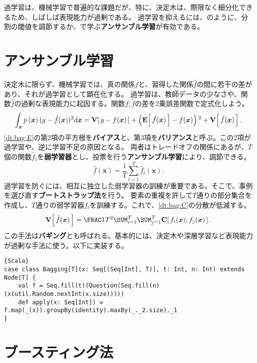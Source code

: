 \documentclass[10pt,a4paper]{book}
\begin{document}
過学習は、機械学習で普遍的な課題だが、特に、決定木は、際限なく細分化できるため、しばしば表現能力が過剰である。
過学習を抑えるには、のように、分割の閾値を調節するか、で学ぶ\textbf{アンサンブル学習}が有効である。

\section{アンサンブル学習\label{sect:dt:ensem}}

決定木に限らず、機械学習では、真の関係$f$と、習得した関係$\hat{f}$の間に若干の差があり、それが過学習として顕在化する。
過学習は、教師データの少なさや、関数$\hat{f}$の過剰な表現能力に起因する。関数$f,\hat{f}$の差を2乗誤差関数で定式化しよう。
%
\begin{equation}
\label{eq:dt:bag:E}
\int_{\bm{x}}\prob{\bm{x}}(y-\hat{f}(\bm{x}))^2d\bm{x} = \Var{y-f(\bm{x})} + \tup{\E{\hat{f}(\bm{x})} - f(\bm{x})}^2 + \Var{\hat{f}(\bm{x})}.
\end{equation}
%
\eqref{dt:bag:E}の第2項の平方根を\textbf{バイアス}と、第3項を\textbf{バリアンス}と呼ぶ。この2項が過学習や、逆に学習不足の原因となる。
両者はトレードオフの関係にあるが、$T$個の関数$\hat{f}_t$を\textbf{弱学習器}とし、投票を行う\textbf{アンサンブル学習}により、調節できる。
%
\begin{equation}
\label{eq:dt:bag:f}
\hat{f}(\bm{x}) = \frac{1}{T} \sum_{t=1}^T \hat{f}_t(\bm{x}).
\end{equation}
%
過学習を防ぐには、相互に独立した弱学習器の訓練が重要である。そこで、事例を選び直す\textbf{ブートストラップ法}を行う。
要素の重複を許して$T$通りの部分集合を作成し、$T$通りの弱学習器$f_t$を訓練する。これで、\eqref{dt:bag:C}の分散が低減する。
%
\begin{equation}
\label{eq:dt:bag:C}
\Var{\hat{f}(\bm{x})} = \frac{1}{T^2}\sum_{i=1}^T \sum_{j=1}^T \Cov{f_i(\bm{x}),f_j(\bm{x})}.
\end{equation}
%
この手法は\textbf{バギング}とも呼ばれる。基本的には、決定木や深層学習など表現能力が過剰な手法に使う。以下に実装する。

\begin{Verbatim}{Scala}
case class Bagging[T](x: Seq[(Seq[Int], T)], t: Int, n: Int) extends Node[T] {
	val f = Seq.fill(t)(Question(Seq.fill(n)(x(util.Random.nextInt(x.size)))))
	def apply(x: Seq[Int]) = f.map(_(x)).groupBy(identity).maxBy(_._2.size)._1
}
\end{Verbatim}

\section{ブースティング法}
\end{document}
